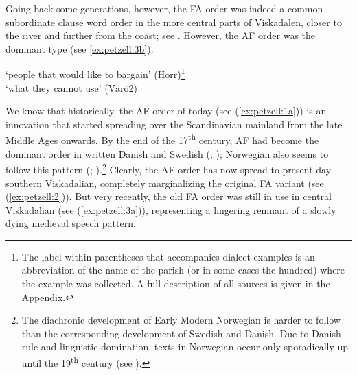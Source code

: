 \documentclass[output=paper,colorlinks,citecolor=brown,draft,draftmode]{langscibook}
\begin{document}
Going back some generations, however, the FA order was indeed a common subordinate clause word order in the more central parts of Viskadalen, closer to the river and further from the coast; see . However, the AF order was the dominant type (see \ref{ex:petzell:3b}).


\ea\label{ex:petzell:3}
\glt `people that would like to bargain’ (Horr)\footnote{The label within parentheses that accompanies dialect examples is an abbreviation of the name of the parish (or in some cases the hundred) where the example was collected. A full description of all sources is given in the Appendix.}  \\
\glt `what they cannot use’ (Värö2)
\z
\z


We know that historically, the AF order of today (see (\ref{ex:petzell:1a})) is an innovation that started spreading over the Scandinavian mainland from the late Middle Ages onwards. By the end of the 17\textsuperscript{th} century, AF had become the dominant order in written Danish \citep{Sundquist2003} and Swedish (\citealt{Falk1993}; \citealt{Hakansson2011}); Norwegian also seems to follow this pattern (\citealt{Christoffersen1997}; \citealt{Vitterso2004}).\footnote{The diachronic development of Early Modern Norwegian is harder to follow than the corresponding development of Swedish and Danish. Due to Danish rule and linguistic domination, texts in Norwegian occur only sporadically up until the 19\textsuperscript{th} century (see \citealt[177–192]{Indrebo2001}).} Clearly, the AF order has now spread to present-day southern Viskadalian, completely marginalizing the original FA variant (see (\ref{ex:petzell:2})). But very recently, the old FA order was still in use in central Viskadalian (see (\ref{ex:petzell:3a})), representing a lingering remnant of a slowly dying medieval speech pattern.
\end{document}
